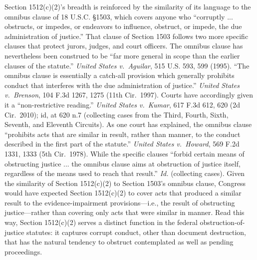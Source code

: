 Section 1512(c)(2)’s breadth is reinforced by the similarity of its language to the omnibus clause of 18 U.S.C. \S 1503, which covers anyone who “corruptly ... obstructs, or impedes, or endeavors to influence, obstruct, or impede, the due administration of justice.” That clause of Section 1503 follows two more specific clauses that protect jurors, judges, and court officers.
The omnibus clause has nevertheless been construed to be “far more general in scope than the earlier clauses of the statute.”
\textit{United States v.\ Aguilar}, 515 U.S. 593, 599 (1995).
“The omnibus clause is essentially a catch-all provision which generally prohibits conduct that interferes with the due administration of justice.”
\textit{United States v.\ Brenson}, 104 F.3d 1267, 1275 (11th Cir.~1997).
Courts have accordingly given it a “non-restrictive reading.”
\textit{United States v.\ Kumar}, 617 F.3d 612, 620 (2d Cir.~2010); id, at 620 n.7 (collecting cases from the Third, Fourth, Sixth, Seventh, and Eleventh Circuits).
As one court has explained, the omnibus clause “prohibits acts that are similar in result, rather than manner, to the conduct described in the first part of the statute.”
\textit{United States v.\ Howard}, 569 F.2d 1331, 1333 (5th Cir.~1978).
While the specific clauses “forbid certain means of obstructing justice ... the omnibus clause aims at obstruction of justice itself, regardless of the means used to reach that result.”
\textit{Id.} (collecting cases).
Given the similarity of Section 1512(c)(2) to Section 1503’s omnibus clause, Congress would have expected Section 1512(c)(2) to cover acts that produced a similar result to the evidence-impairment provisions---i.e., the result of obstructing justice---rather than covering only acts that were similar in manner.
Read this way, Section 1512(c)(2) serves a distinct function in the federal obstruction-of-justice statutes: it captures corrupt conduct, other than document destruction, that has the natural tendency to obstruct contemplated as well as pending proceedings.

